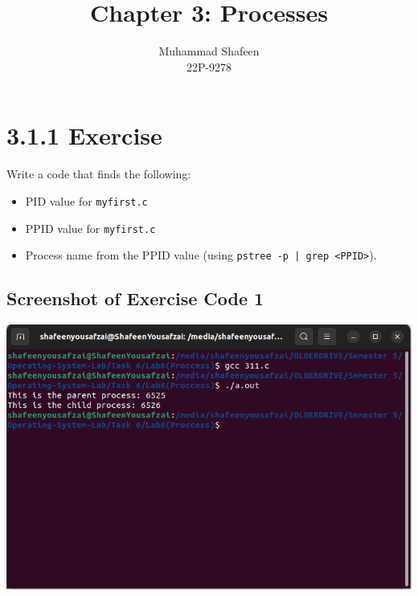 \documentclass[12pt]{article}
\title{Chapter 3: Processes}
\author{Muhammad Shafeen \\ 22P-9278 }
\date{}
\begin{document}
\maketitle
\tableofcontents

\section{3.1.1 Exercise}

Write a code that finds the following:
\begin{itemize}
    \item PID value for \texttt{myfirst.c}
    \item PPID value for \texttt{myfirst.c}
    \item Process name from the PPID value (using \texttt{pstree -p | grep <PPID>}).
\end{itemize}

\subsection{Screenshot of Exercise Code 1}
\includegraphics[width=\textwidth]{image.png} %
\end{document}
